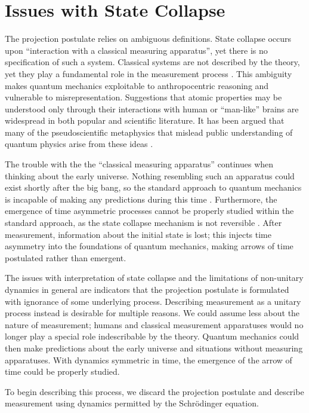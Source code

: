 \section{Issues with State Collapse}
The projection postulate relies on ambiguous definitions. State collapse occurs upon ``interaction with a classical measuring apparatus'', yet there is no specification of such a system. Classical systems are not described by the theory, yet they play a fundamental role in the measurement process \cite{landau}. This ambiguity makes quantum mechanics exploitable to anthropocentric reasoning and vulnerable to misrepresentation. Suggestions that atomic properties may be understood only through their interactions with human or ``man-like'' brains are widespread in both popular \cite{Capra} and scientific \cite{stapp} literature. It has been argued that many of the pseudoscientific metaphysics that mislead public understanding of quantum physics arise from these ideas \cite{stenger}.

The trouble with the the ``classical measuring apparatus'' continues when thinking about the early universe. Nothing resembling such an apparatus could exist shortly after the big bang, so the standard approach to quantum mechanics is incapable of making any predictions during this time \cite{Craig}. Furthermore, the emergence of time asymmetric processes cannot be properly studied within the standard approach, as the state collapse mechanism is not reversible \cite{mann}. After measurement, information about the initial state is lost; this injects time asymmetry into the foundations of quantum mechanics, making arrows of time postulated rather than emergent.

The issues with interpretation of state collapse and the limitations of non-unitary dynamics in general are indicators that the projection postulate is formulated with ignorance of some underlying process. Describing measurement as a unitary process instead is desirable for multiple reasons. We could assume less about the nature of measurement; humans and classical measurement apparatuses would no longer play a special role indescribable by the theory. Quantum mechanics could then make predictions about the early universe and situations without measuring apparatuses. With dynamics symmetric in time, the emergence of the arrow of time could be properly studied.

To begin describing this process, we discard the projection postulate and describe measurement using dynamics permitted by the Schrödinger equation.
%

